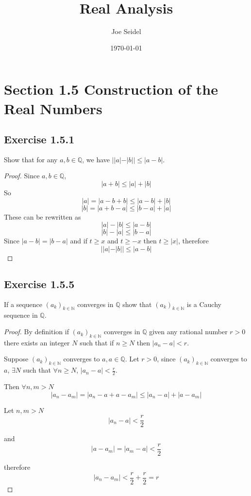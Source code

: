 \documentclass{tufte-book}
\title{Real Analysis}
\author{Joe Seidel}
\date{\today}
\theoremstyle{mytheoremstyle}
\theoremstyle{mylemstyle}
\theoremstyle{mydefstyle}
\begin{document}
\maketitle
{}
\newpage
{}

\section{Section 1.5 Construction of the Real Numbers}

\subsection{Exercise 1.5.1} 

Show that for any $a, b \in \mathbb{Q}$, we have $||a|-|b|| \leq |a-b|$.

\begin{proof} Since $a,b \in \mathbb{Q}$, 
\[|a+b| \leq |a|+|b|\]
So
\[|a|=|a-b+b| \leq |a-b| + |b|\]
\[|b|=|a+b-a| \leq |b-a| + |a|\]
These can be rewritten as 
\[|a|-|b| \leq |a-b|\]
\[|b|-|a| \leq |b-a|\]
Since $|a-b|=|b-a|$ and if $t \geq x$ and $t \geq -x$ then $t \geq |x|$, therefore 
\[||a|-|b|| \leq |a-b| \]\end{proof}

\subsection{Exercise 1.5.5}
If a sequence $(a_k)_{k \in \mathbb{N}}$ converges in $\mathbb{Q}$ show that 
$(a_k)_{k \in \mathbb{N}}$ is a Cauchy sequence in $\mathbb{Q}$.

\begin{proof}By definition if $(a_k)_{k \in \mathbb{N}}$ converges in $\mathbb{Q}$ given any rational number $r > 0$ there exists an integer $N$ such that if $n \geq N$ then $|a_n-a|<r$. 

Suppose $(a_k)_{k \in \mathbb{N}}$ converges to $a, a \in \mathbb{Q}$. Let $r>0$, since $(a_k)_{k \in \mathbb{N}}$ converges to $a$,  $\exists N$ such that $\forall n \geq N$, $|a_n-a| < \frac{r}{2}$.

Then $\forall n,m > N$
\[|a_n-a_m| = |a_n-a+a-a_m| \leq |a_n-a| + |a-a_m|\]

Let $n,m > N$ 
\[|a_n-a| < \frac{r}{2}\]

and
\[|a-a_m| = |a_m-a| < \frac{r}{2}\]

therefore
\[|a_n-a_m|< \frac{r}{2} + \frac{r}{2} = r\]
\end{proof}
\end{document}
